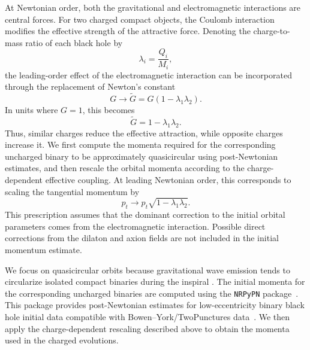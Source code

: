At Newtonian order, both the gravitational and electromagnetic interactions are central forces. For two charged compact objects, the Coulomb interaction modifies the effective strength of the attractive force. Denoting the charge-to-mass ratio of each black hole by
\begin{equation}
\lambda_i = \frac{Q_i}{M_i},
\end{equation}
the leading-order effect of the electromagnetic interaction can be incorporated through the replacement of Newton's constant
\begin{equation}
G \rightarrow \tilde{G} = G\left(1-\lambda_1\lambda_2\right).
\end{equation}
In units where $G=1$, this becomes
\begin{equation}
\tilde{G} = 1-\lambda_1\lambda_2 .
\end{equation}
Thus, similar charges reduce the effective attraction, while opposite charges increase it. We first compute the momenta required for the corresponding uncharged binary to be approximately quasicircular using post-Newtonian estimates, and then rescale the orbital momenta according to the charge-dependent effective coupling. At leading Newtonian order, this corresponds to scaling the tangential momentum by
\begin{equation}
p_t \rightarrow p_t \sqrt{1-\lambda_1\lambda_2}.
\end{equation}
This prescription assumes that the dominant correction to the initial orbital parameters comes from the electromagnetic interaction.  Possible direct corrections from the dilaton and axion fields are not included in the initial momentum estimate.

We focus on quasicircular orbits because gravitational wave emission tends to circularize isolated compact binaries during the inspiral \cite{Peters1964,Pfeiffer2007ReducingEccentricity}.  The initial momenta for the corresponding uncharged binaries are computed using the \texttt{NRPyPN} package~\cite{Etienne2023_NRPyPN}. This package provides post-Newtonian estimates for low-eccentricity binary black hole initial data compatible with Bowen--York/TwoPunctures data~\cite{Healy2017_PNQuasicircular,RamosBuades2019_EccRed}. We then apply the charge-dependent rescaling described above to obtain the momenta used in the charged evolutions.

